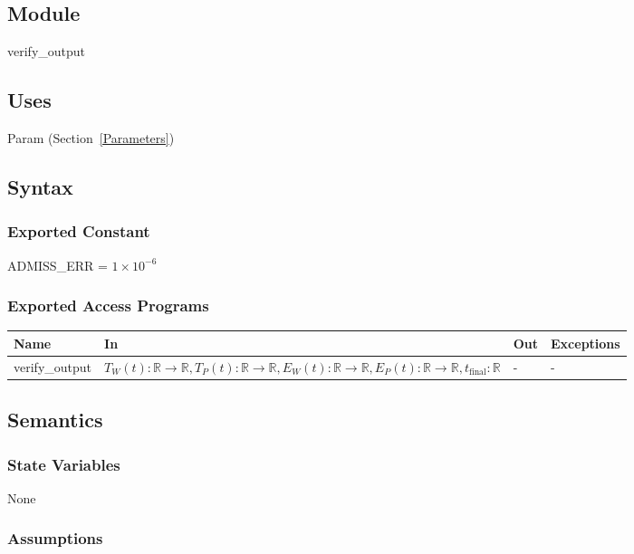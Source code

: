 \documentclass[12pt, titlepage]{article}
\begin{document}
\subsection{Module}

verify\_output

\subsection{Uses}

Param (Section~\ref{Parameters})

\subsection{Syntax}

\subsubsection{Exported Constant}

ADMISS\_ERR = $1 \times 10^{-6}$

\subsubsection{Exported Access Programs}

\begin{center}
\begin{tabular}{p{3cm} p{7cm} p{2cm} p{2cm}}
\hline
\textbf{Name} & \textbf{In} & \textbf{Out} & \textbf{Exceptions} \\
\hline
verify\_output & $T_W(t):\mathbb{R} \rightarrow \mathbb{R},
                 T_P(t):\mathbb{R} \rightarrow \mathbb{R},
                 E_W(t):\mathbb{R} \rightarrow \mathbb{R},
                 E_P(t):\mathbb{R} \rightarrow \mathbb{R},
                 t_\text{final}: \mathbb{R}$ & - & - \\
\hline
\end{tabular}
\end{center}

\subsection{Semantics}

\subsubsection{State Variables}

None

\subsubsection{Assumptions}
\end{document}
